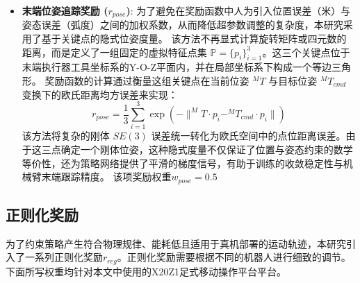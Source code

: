 \begin{itemize}
    \item \textbf{末端位姿追踪奖励 ($r_{pose}$)}:
          为了避免在奖励函数中人为引入位置误差（米）与姿态误差（弧度）之间的加权系数，从而降低超参数调整的复杂度，本研究采用了基于关键点的隐式位姿度量\cite{portela2025wholebodyendeffectorposetracking}。
          该方法不再显式计算旋转矩阵或四元数的距离，而是定义了一组固定的虚拟特征点集 $\mathbb{P} = \{p_i\}_{i=1}^3$。这三个关键点位于末端执行器工具坐标系的Y-O-Z平面内，并在局部坐标系下构成一个等边三角形。
          奖励函数的计算通过衡量这组关键点在当前位姿 $^MT$ 与目标位姿 $^MT_{cmd}$ 变换下的欧氏距离均方误差来实现：
          \begin{equation}
              r_{pose} = \frac{1}{3} \sum_{i=1}^{3} \exp \left( -\| ^MT \cdot p_i - ^MT_{cmd} \cdot p_i \| \right)
          \end{equation}
          该方法将复杂的刚体 $SE(3)$ 误差统一转化为欧氏空间中的点位距离误差。由于这三点确定一个刚体位姿，这种隐式度量不仅保证了位置与姿态约束的数学等价性，还为策略网络提供了平滑的梯度信号，有助于训练的收敛稳定性与机械臂末端跟踪精度\cite{portela2025wholebodyendeffectorposetracking}。
          该项奖励权重$w_{pose} = 0.5$
\end{itemize}

\subsection{正则化奖励}
为了约束策略产生符合物理规律、能耗低且适用于真机部署的运动轨迹，本研究引入了一系列正则化奖励$r_{reg}$。正则化奖励需要根据不同的机器人进行细致的调节。下面所写权重均针对本文中使用的X20Z1足式移动操作平台平台。

